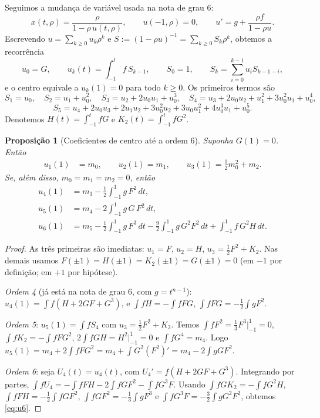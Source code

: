 \documentclass[11pt]{article}
\theoremstyle{plain}
\newtheorem{proposition}[theorem]{Proposição}
\theoremstyle{definition}
\theoremstyle{remark}
\begin{document}
Seguimos a mudança de variável usada na nota de grau 6:
\[
 x(t,\rho)=\frac{\rho}{1-\rho\,u(t,\rho)},\qquad u(-1,\rho)=0,
 \qquad u'=g+\frac{\rho f}{1-\rho u}.
\]
Escrevendo $u=\sum_{k\ge0}u_k\rho^k$ e $S:=(1-\rho u)^{-1}=\sum_{k\ge0}S_k\rho^k$,
obtemos a recorrência
\begin{equation}\label{eq:rec}
 u_0=G,\qquad u_k(t)=\int_{-1}^t f\,S_{k-1},\qquad
 S_0=1,\qquad S_k=\sum_{i=0}^{k-1}u_iS_{k-1-i},
\end{equation}
e o centro equivale a $u_k(1)=0$ para todo $k\ge0$. Os primeiros termos são
\[
 S_1=u_0,\quad S_2=u_1+u_0^2,\quad S_3=u_2+2u_0u_1+u_0^3,\quad
 S_4=u_3+2u_0u_2+u_1^2+3u_0^2u_1+u_0^4,
\]
\[
 S_5=u_4+2u_0u_3+2u_1u_2+3u_0^2u_2+3u_0u_1^2+4u_0^3u_1+u_0^5.
\]
Denotemos $H(t)=\int_{-1}^t fG$ e $K_2(t)=\int_{-1}^t fG^2$.

\begin{proposition}[Coeficientes de centro até a ordem 6]\label{prop:ident}
Suponha $G(1)=0$. Então
\begin{align*}
 u_1(1)&=m_0,\qquad u_2(1)=m_1,\qquad u_3(1)=\tfrac12 m_0^2+m_2.
\end{align*}
Se, além disso, $m_0=m_1=m_2=0$, então
\begin{align}
 u_4(1)&=m_3-\frac12\int_{-1}^1 g\,F^2\,dt, \label{eq:u4}\\
 u_5(1)&=m_4-2\int_{-1}^1 g\,G\,F^2\,dt, \label{eq:u5}\\
 u_6(1)&=m_5-\frac12\int_{-1}^1 g\,F^3\,dt-\frac92\int_{-1}^1 g\,G^2F^2\,dt
 +\int_{-1}^1 f\,G^2H\,dt. \label{eq:u6}
\end{align}
\end{proposition}

\begin{proof}
As três primeiras são imediatas: $u_1=F$, $u_2=H$, $u_3=\tfrac12F^2+K_2$. Nas
demais usamos $F(\pm1)=H(\pm1)=K_2(\pm1)=G(\pm1)=0$ (em $-1$ por definição; em
$+1$ por hipótese).

\emph{Ordem 4} (já está na nota de grau 6, com $g=t^{n-1}$):
$u_4(1)=\int f(H+2GF+G^3)$, e $\int fH=-\int fFG$, $\int fFG=-\frac12\int gF^2$.

\emph{Ordem 5}: $u_5(1)=\int fS_4$ com $u_3=\frac12F^2+K_2$. Temos
$\int fF^2=\frac13F^3\big|_{-1}^1=0$, $\int fK_2=-\int fFG^2$,
$2\int fGH=H^2\big|_{-1}^1=0$ e $\int fG^4=m_4$. Logo
$u_5(1)=m_4+2\int fFG^2=m_4+\int G^2(F^2)'=m_4-2\int gGF^2$.

\emph{Ordem 6}: seja $U_4(t)=u_4(t)$, com $U_4'=f(H+2GF+G^3)$. Integrando por
partes, $\int fU_4=-\int fFH-2\int fGF^2-\int fG^3F$. Usando $\int fGK_2=-\int fG^2H$,
$\int fFH=-\frac12\int fGF^2$, $\int fGF^2=-\frac13\int gF^3$ e
$\int fG^3F=-\frac32\int gG^2F^2$, obtemos \eqref{eq:u6}.
\end{proof}
\end{document}
